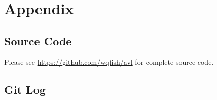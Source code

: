 \section{Appendix}

\subsection{Source Code}

Please see \url{https://github.com/wqfish/avl} for complete source code.



\subsection{Git Log}


